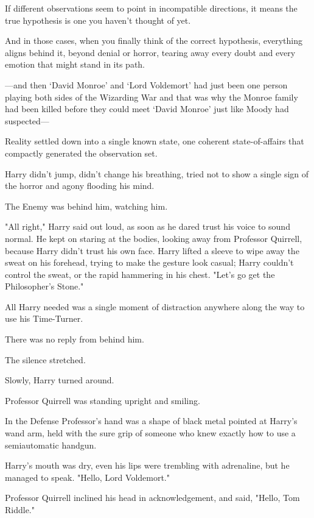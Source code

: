 If different observations seem to point in incompatible directions, it means 
the true hypothesis is one you haven't thought of yet.

And in those cases, when you finally think of the correct hypothesis, 
everything aligns behind it, beyond denial or horror, tearing away every doubt 
and every emotion that might stand in its path.

---and then `David Monroe' and `Lord Voldemort' had just been one person 
playing both sides of the Wizarding War and that was why the Monroe family had 
been killed before they could meet `David Monroe' just like Moody had 
suspected---

Reality settled down into a single known state, one coherent state-of-affairs 
that compactly generated the observation set.

Harry didn't jump, didn't change his breathing, tried not to show a single sign 
of the horror and agony flooding his mind.

The Enemy was behind him, watching him.

"All right," Harry said out loud, as soon as he dared trust his voice to sound 
normal. He kept on staring at the bodies, looking away from Professor Quirrell, 
because Harry didn't trust his own face. Harry lifted a sleeve to wipe away the 
sweat on his forehead, trying to make the gesture look casual; Harry couldn't 
control the sweat, or the rapid hammering in his chest. "Let's go get the 
Philosopher's Stone."

All Harry needed was a single moment of distraction anywhere along the way to 
use his Time-Turner.

There was no reply from behind him.

The silence stretched.

Slowly, Harry turned around.

Professor Quirrell was standing upright and smiling.

In the Defense Professor's hand was a shape of black metal pointed at Harry's 
wand arm, held with the sure grip of someone who knew exactly how to use a 
semiautomatic handgun.

Harry's mouth was dry, even his lips were trembling with adrenaline, but he 
managed to speak. "Hello, Lord Voldemort."

Professor Quirrell inclined his head in acknowledgement, and said, "Hello, Tom 
Riddle."
